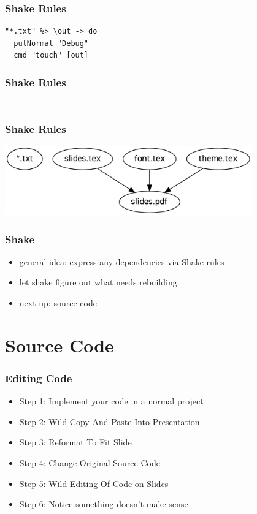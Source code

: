 \documentclass{beamer}
\begin{document}
\begin{frame}[fragile]
  \frametitle{Shake Rules}
  \begin{verbatim}
"*.txt" %> \out -> do
  putNormal "Debug"
  cmd "touch" [out]
  \end{verbatim}
\end{frame}

\begin{frame}[fragile]
  \frametitle{Shake Rules}
  \inputminted[autogobble]{haskell}{snippets/pdf-rule.hs}
  \inputminted[autogobble]{haskell}{snippets/latexmk-rule.hs}
\end{frame}

\begin{frame}
  \frametitle{Shake Rules}
  \begin{center}
    \includegraphics[width=0.8\textwidth]{graphviz/rules.png}
  \end{center}
\end{frame}

\begin{frame}
  \frametitle{Shake}
  \begin{itemize}
  \item general idea: express any dependencies via Shake rules
  \item let shake figure out what needs rebuilding
  \item next up: source code
  \end{itemize}
\end{frame}

\section{Source Code}

\begin{frame}
  \frametitle{Editing Code}
  \begin{itemize}
  \item Step 1: Implement your code in a normal project
  \item Step 2: Wild Copy And Paste Into Presentation
  \item Step 3: Reformat To Fit Slide
  \item Step 4: Change Original Source Code
  \item Step 5: Wild Editing Of Code on Slides
  \item Step 6: Notice something doesn't make sense
  \end{itemize}
\end{frame}
\end{document}
